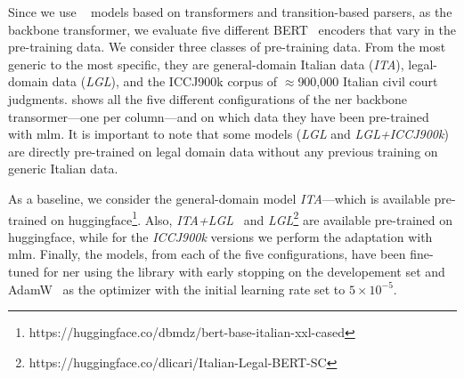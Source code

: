




Since we use \spacy~\cite{honnibal2020spacy} models based on transformers and transition-based parsers, as the backbone transformer, we evaluate five different BERT~\cite{devlin-etal-2019-bert} encoders that vary in the pre-training data. We consider three classes of pre-training data. From the most generic to the most specific, they are general-domain Italian data (\textit{ITA}), legal-domain data (\textit{LGL}), and the ICCJ900k corpus of $\approx$900,000 Italian civil court judgments.
 shows all the five different configurations of the \ac{ner} backbone transormer---one per column---and on which data they have been pre-trained with \acf{mlm}. It is important to note that some models (\textit{LGL} and \textit{LGL+ICCJ900k}) are directly pre-trained on legal domain data without any previous training on generic Italian data.



As a baseline, we consider the general-domain model \textit{ITA}---which is available pre-trained on huggingface\footnote{https://huggingface.co/dbmdz/bert-base-italian-xxl-cased}.
Also, \textit{ITA+LGL}~\cite{licari_italian-legal-bert_2022} and \textit{LGL}\footnote{https://huggingface.co/dlicari/Italian-Legal-BERT-SC} are available pre-trained on huggingface, while for the \textit{ICCJ900k} versions we perform the adaptation with \ac{mlm}.
Finally, the models, from each of the five configurations, have been fine-tuned for \ac{ner} using the \spacy library with early stopping on the developement set and AdamW~\cite{loshchilov2018decoupled} as the optimizer with the initial learning rate set to $5 \times 10^{-5}$.

